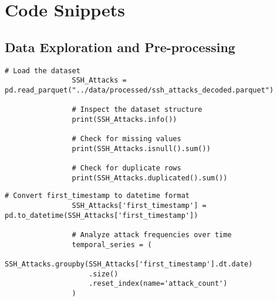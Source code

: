 
\appendix

\section{Code Snippets}


        \subsection{Data Exploration and Pre-processing}
        
            \vspace{0.5em}

            \begin{lstlisting}[caption={Load and inspect the dataset}, label={lst:load-inspect-dataset}]
                # Load the dataset
                SSH_Attacks = pd.read_parquet("../data/processed/ssh_attacks_decoded.parquet")
        
                # Inspect the dataset structure
                print(SSH_Attacks.info())
        
                # Check for missing values
                print(SSH_Attacks.isnull().sum())
        
                # Check for duplicate rows
                print(SSH_Attacks.duplicated().sum())
            \end{lstlisting}
            
            \vspace{0.5em}

            \begin{lstlisting}[caption={Convert timestamps and analyze frequencies}, label={lst:convert-analyze-frequencies}]
                # Convert first_timestamp to datetime format
                SSH_Attacks['first_timestamp'] = pd.to_datetime(SSH_Attacks['first_timestamp'])

                # Analyze attack frequencies over time
                temporal_series = (
                    SSH_Attacks.groupby(SSH_Attacks['first_timestamp'].dt.date)
                    .size()
                    .reset_index(name='attack_count')
                )
            \end{lstlisting}
            
